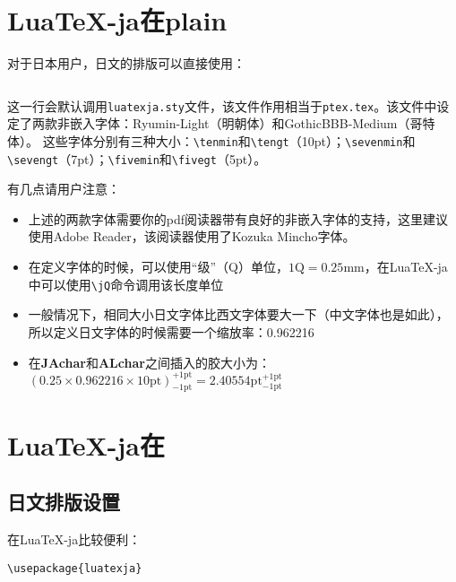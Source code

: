 \documentclass{ltjarticle}
\def\LuaTeX{Lua\TeX}
\def\pTeX{p\TeX}
\begin{document}
\section{\LuaTeX-ja在plain }
对于日本用户，日文的排版可以直接使用：
\begin{verbatim}

\end{verbatim}

这一行会默认调用\verb!luatexja.sty!文件，该文件作用相当于\verb!ptex.tex!。该文件中设定了两款非嵌入字体：Ryumin-Light（明朝体）和GothicBBB-Medium（哥特体）。
这些字体分别有三种大小：\verb!\tenmin!和\verb!\tengt!（10pt）；\verb!\sevenmin!和\verb!\sevengt!（7pt）；\verb!\fivemin!和\verb!\fivegt!（5pt）。

有几点请用户注意：
\begin{itemize}
\item 上述的两款字体需要你的pdf阅读器带有良好的非嵌入字体的支持，这里建议使用Adobe Reader，该阅读器使用了Kozuka Mincho字体。
\item 在定义字体的时候，可以使用“级”（Q）单位，$1 \mathrm{Q} = 0.25\mathrm{mm}$，在\LuaTeX-ja中可以使用\verb!\jQ!命令调用该长度单位
\item 一般情况下，相同大小日文字体比西文字体要大一下（中文字体也是如此），所以定义日文字体的时候需要一个缩放率：0.962216
\item 在\textbf{JAchar}和\textbf{ALchar}之间插入的胶大小为：$(0.25\times0.962216\times\mathrm{10pt})^{\mathrm{+1pt}}_{\mathrm{-1pt}} = 2.40554\mathrm{pt}^{\mathrm{+1pt}}_{\mathrm{-1pt}}$
\end{itemize}
\section{\LuaTeX-ja在}
\subsection{日文排版设置}
在\LuaTeX-ja比较便利：
\begin{verbatim}
\usepackage{luatexja}
\end{verbatim}
\end{document}
